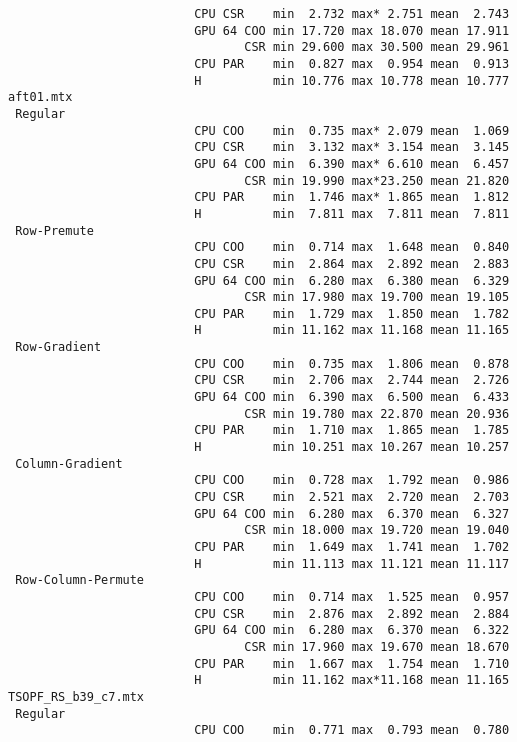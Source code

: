 {\begin{verbatim}
                          CPU CSR    min  2.732 max* 2.751 mean  2.743
                          GPU 64 COO min 17.720 max 18.070 mean 17.911
                                 CSR min 29.600 max 30.500 mean 29.961
                          CPU PAR    min  0.827 max  0.954 mean  0.913
                          H          min 10.776 max 10.778 mean 10.777
aft01.mtx
 Regular
                          CPU COO    min  0.735 max* 2.079 mean  1.069
                          CPU CSR    min  3.132 max* 3.154 mean  3.145
                          GPU 64 COO min  6.390 max* 6.610 mean  6.457
                                 CSR min 19.990 max*23.250 mean 21.820
                          CPU PAR    min  1.746 max* 1.865 mean  1.812
                          H          min  7.811 max  7.811 mean  7.811
 Row-Premute
                          CPU COO    min  0.714 max  1.648 mean  0.840
                          CPU CSR    min  2.864 max  2.892 mean  2.883
                          GPU 64 COO min  6.280 max  6.380 mean  6.329
                                 CSR min 17.980 max 19.700 mean 19.105
                          CPU PAR    min  1.729 max  1.850 mean  1.782
                          H          min 11.162 max 11.168 mean 11.165
 Row-Gradient
                          CPU COO    min  0.735 max  1.806 mean  0.878
                          CPU CSR    min  2.706 max  2.744 mean  2.726
                          GPU 64 COO min  6.390 max  6.500 mean  6.433
                                 CSR min 19.780 max 22.870 mean 20.936
                          CPU PAR    min  1.710 max  1.865 mean  1.785
                          H          min 10.251 max 10.267 mean 10.257
 Column-Gradient
                          CPU COO    min  0.728 max  1.792 mean  0.986
                          CPU CSR    min  2.521 max  2.720 mean  2.703
                          GPU 64 COO min  6.280 max  6.370 mean  6.327
                                 CSR min 18.000 max 19.720 mean 19.040
                          CPU PAR    min  1.649 max  1.741 mean  1.702
                          H          min 11.113 max 11.121 mean 11.117
 Row-Column-Permute
                          CPU COO    min  0.714 max  1.525 mean  0.957
                          CPU CSR    min  2.876 max  2.892 mean  2.884
                          GPU 64 COO min  6.280 max  6.370 mean  6.322
                                 CSR min 17.960 max 19.670 mean 18.670
                          CPU PAR    min  1.667 max  1.754 mean  1.710
                          H          min 11.162 max*11.168 mean 11.165
TSOPF_RS_b39_c7.mtx
 Regular
                          CPU COO    min  0.771 max  0.793 mean  0.780

\end{verbatim}}
